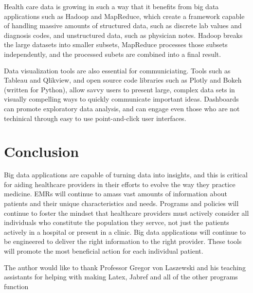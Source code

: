 \documentclass[sigconf]{acmart}
\begin{document}
 Health care data is growing in such a way that it benefits from  big data applications such as Hadoop and MapReduce, which create a framework capable of handling massive amounts of structured data, such as discrete lab values and diagnosis codes, and unstructured data, such as physician notes. Hadoop breaks the large datasets into smaller subsets, MapReduce processes those subsets independently, and the processed subets are combined into a final result\cite{editor13}.

 Data visualization tools are also essential for communiciating. Tools such as Tableau and Qlikview, and open source code libraries such as Plotly and Bokeh (written for Python), allow savvy users to present large, complex data sets in visually compelling ways to quickly communicate important ideas. Dashboards can promote exploratory data analysis, and can engage even those who are not techinical through easy to use point-and-click user interfaces.
 
\section{Conclusion}

 Big data applications are capable of turning data into insights, and this is critical for aiding healthcare providers in their efforts to evolve the way they practice medicine. EMRs will continue to amass vast amounts of information about patients and their unique characteristics and needs. Programs and policies will continue to foster the mindset that healthcare providers must actively consider all individuals who constitute the population they servce, not just the patients actively in a hospital or present in a clinic. Big data applications will continue to be engineered to deliver the right information to the right provider. These tools will promote the most beneficial action for each individual patient.   

\begin{acks}

  The author would like to thank Professor Gregor von Laszewski and his teaching assistants for helping with making Latex, Jabref and all of the other programs function 

\end{acks}


 
\end{document}
